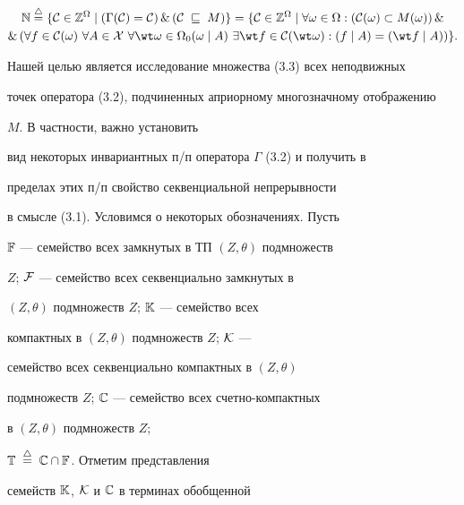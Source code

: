 \begin{multline}


{\Bbb N}\stac \{{\cal C} \in {{\Bbb Z}^{\Omega}} \mid


({{\Gamma}({\cal C})} = {\cal C})\, \&\, ({\cal C}\;\sqsubseteq\;M)\} =


\{{\cal C} \in {{\Bbb Z}^{\Omega}} \mid


\forall{\omega} \in \Omega: ({{\cal C}(\omega)} \subset


{M(\omega)})\, \& \\


%


\&\,(\forall{f} \in {{\cal C}(\omega)}\ \forall{A} \in {\cal X}


\ \forall{\wt \omega} \in {{{\Omega}_0}(\omega \mid A)}


\ \exists{\wt f} \in {{\cal C}({\wt \omega})}:


(f \mid A) = ({\wt f} \mid A))\}.


\end{multline}


Нашей целью является исследование множества (3.3) всех неподвижных


точек оператора (3.2), подчиненных априорному многозначному отображению


$M$. В частности, важно установить


вид некоторых инвариантных п/п оператора $\Gamma$ (3.2) и получить в


пределах этих п/п свойство секвенциальной непрерывности


в смысле (3.1). Условимся о некоторых обозначениях. Пусть


${\Bbb F}$ --- семейство всех замкнутых в ТП $(Z,\theta)$ подмножеств


$Z$; ${\cal F}$ --- семейство всех секвенциально замкнутых в


$(Z,\theta)$ подмножеств $Z$; ${\Bbb K}$ --- семейство всех


компактных в $(Z,\theta)$ подмножеств $Z$; ${\cal K}$ ---


семейство всех секвенциально компактных в $(Z,\theta)$


подмножеств $Z$; ${\Bbb C}$ --- семейство всех счетно-компактных


в $(Z,\theta)$ подмножеств $Z$;


${\Bbb T}\;\overset{\triangle}{=}{}\;{\Bbb C} \cap {\Bbb F}$. Отметим представления


семейств ${\Bbb K}$, ${\cal K}$ и ${\Bbb C}$  в терминах обобщенной


